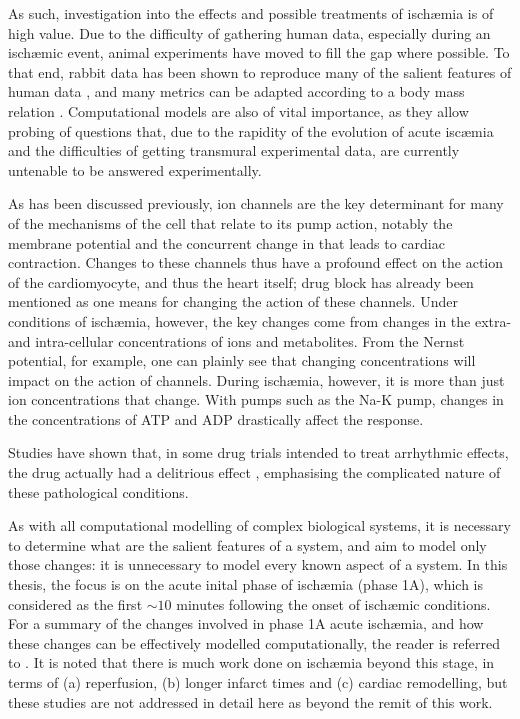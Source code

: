 \documentclass[../thesis-main.tex]{subfiles}
\begin{document}
As such, investigation into the effects and possible treatments of isch\ae{}mia  is of high value. Due to the difficulty of gathering human data, especially during an isch\ae{}mic event, animal experiments have moved to fill the gap where possible. To that end, rabbit data has been shown to reproduce many of the salient features of human data \citep{Giles1988, Barrett1997, Panfilov2006}, and many metrics can be adapted according to a body mass relation \citep{Noujaim2007}. Computational models are also of vital importance, as they allow probing of questions that, due to the rapidity of the evolution of acute isc\ae mia and the difficulties of getting transmural experimental data, are currently untenable to be answered experimentally.

As has been discussed previously, ion channels are the key determinant for many of the mechanisms of the cell that relate to its pump action, notably the membrane potential and the concurrent change in \cai{} that leads to cardiac contraction. Changes to these channels thus have a profound effect on the action of the cardiomyocyte, and thus the heart itself; drug block has already been mentioned as one means for changing the action of these channels. Under conditions of isch\ae{}mia, however, the key changes come from changes in the extra- and intra-cellular concentrations of ions and metabolites. From the Nernst potential, for example, one can plainly see that changing concentrations will impact on the action of channels. During isch\ae{}mia, however, it is more than just ion concentrations that change. With pumps such as the Na-K pump, changes in the concentrations of ATP and ADP drastically affect the response.

Studies have shown that, in some drug trials intended to treat arrhythmic effects, the drug actually had a delitrious effect \citep{Chen1998}, emphasising the complicated nature of these pathological conditions.

As with all computational modelling of complex biological systems, it is necessary to determine what are the salient features of a system, and aim to model only those changes: it is unnecessary to model every known aspect of a system.  In this thesis, the focus is on the acute inital phase of isch\ae{}mia (phase 1A), which is considered as the first $\sim10$ minutes following the onset of isch\ae{}mic conditions. For a summary of the changes involved in phase 1A acute isch\ae{}mia, and how these changes can be effectively modelled computationally, the reader is referred to \citep{Rodriguez2006}. It is noted that there is much work done on isch\ae{}mia beyond this stage, in terms of (a) reperfusion, (b) longer infarct times and (c) cardiac remodelling, but these studies are not addressed in detail here as beyond the remit of this work.
\end{document}
